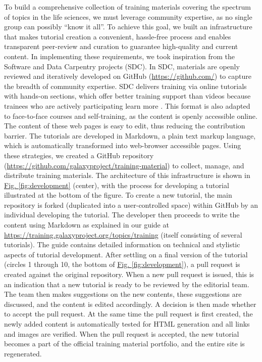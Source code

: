 To build a comprehensive collection of training materials covering the spectrum of topics in the life sciences, we must leverage community expertise, as no single group can possibly “know it all”. To achieve this goal, we built an infrastructure that makes tutorial creation a convenient, hassle-free process and enables transparent peer-review and curation to guarantee high-quality and current content. In implementing these requirements, we took inspiration from the Software and Data Carpentry \cite{wilson2014software} projects (SDC). In SDC, materials are openly reviewed and iteratively developed on GitHub (\url{https://github.com/}) to capture the breadth of community expertise. SDC delivers training via online tutorials with hands-on sections, which offer better training support than videos because trainees who are actively participating learn more \cite{dollar2007enhancing}.
This format is also adapted to face-to-face courses and self-training, as the content is openly accessible online. The content of these web pages is easy to edit, thus reducing the contribution barrier. The tutorials are developed in Markdown, a plain text markup language, which is automatically transformed into web-browser accessible pages. Using these strategies, we created a GitHub repository (\url{https://github.com/galaxyproject/training-material}) to collect, manage, and distribute training materials.
The architecture of this infrastructure is shown in \hyperref[fig:development]{Fig. \ref{fig:development}} (center), with the process for developing a tutorial illustrated at the bottom of the figure. To create a new tutorial, the main repository is forked (duplicated into a user-controlled space) within GitHub by an individual developing the tutorial. The developer then proceeds to write the content using Markdown as explained in our guide at \url{https://training.galaxyproject.org/topics/training} (itself consisting of several tutorials). The guide contains detailed information on technical and stylistic aspects of tutorial development.
After settling on a final version of the tutorial (circles 1 through 10, the bottom of \hyperref[fig:development]{Fig. \ref{fig:development}}), a pull request is created against the original repository. When a new pull request is issued, this is an indication that a new tutorial is ready to be reviewed by the editorial team. The team then makes suggestions on the new contents, these suggestions are discussed, and the content is edited accordingly. A decision is then made whether to accept the pull request. At the same time the pull request is first created, the newly added content is automatically tested for HTML generation and all links and images are verified. When the pull request is accepted, the new tutorial becomes a part of the official training material portfolio, and the entire site is regenerated.

